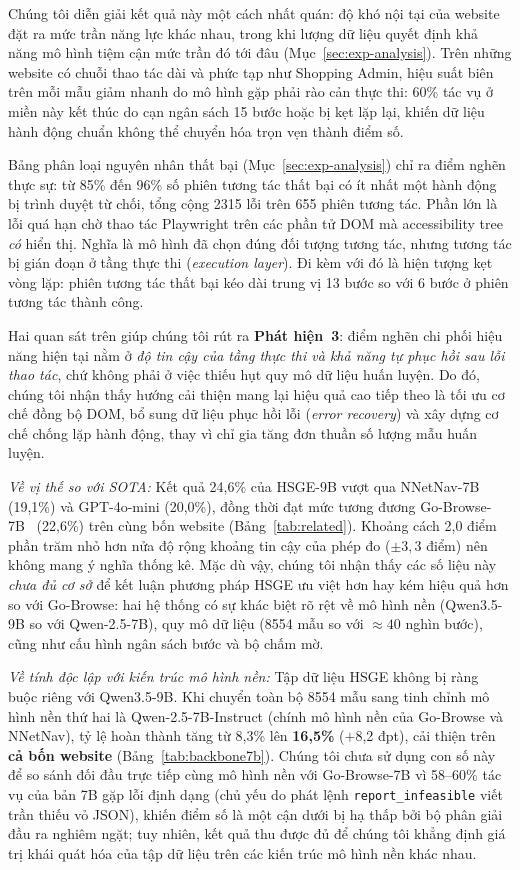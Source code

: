 Chúng tôi diễn giải kết quả này một cách nhất quán: độ khó nội tại của website đặt ra mức trần năng lực khác nhau, trong khi lượng dữ liệu quyết định khả năng mô hình tiệm cận mức trần đó tới đâu (Mục~\ref{sec:exp-analysis}). Trên những website có chuỗi thao tác dài và phức tạp như Shopping Admin, hiệu suất biên trên mỗi mẫu giảm nhanh do mô hình gặp phải rào cản thực thi: 60\% tác vụ ở miền này kết thúc do cạn ngân sách 15 bước hoặc bị kẹt lặp lại, khiến dữ liệu hành động chuẩn không thể chuyển hóa trọn vẹn thành điểm số.

Bảng phân loại nguyên nhân thất bại (Mục~\ref{sec:exp-analysis}) chỉ ra điểm nghẽn thực sự: từ 85\% đến 96\% số phiên tương tác thất bại có ít nhất một hành động bị trình duyệt từ chối, tổng cộng 2315 lỗi trên 655 phiên tương tác. Phần lớn là lỗi quá hạn chờ thao tác Playwright trên các phần tử DOM mà accessibility tree \emph{có} hiển thị. Nghĩa là mô hình đã chọn đúng đối tượng tương tác, nhưng tương tác bị gián đoạn ở tầng thực thi (\emph{execution layer}). Đi kèm với đó là hiện tượng kẹt vòng lặp: phiên tương tác thất bại kéo dài trung vị 13 bước so với 6 bước ở phiên tương tác thành công.

Hai quan sát trên giúp chúng tôi rút ra \textbf{Phát hiện~3}: điểm nghẽn chi phối hiệu năng hiện tại nằm ở \emph{độ tin cậy của tầng thực thi và khả năng tự phục hồi sau lỗi thao tác}, chứ không phải ở việc thiếu hụt quy mô dữ liệu huấn luyện. Do đó, chúng tôi nhận thấy hướng cải thiện mang lại hiệu quả cao tiếp theo là tối ưu cơ chế đồng bộ DOM, bổ sung dữ liệu phục hồi lỗi (\emph{error recovery}) và xây dựng cơ chế chống lặp hành động, thay vì chỉ gia tăng đơn thuần số lượng mẫu huấn luyện.

\emph{Về vị thế so với SOTA:} Kết quả 24{,}6\% của HSGE-9B vượt qua NNetNav-7B~\cite{murty2024nnetnav} (19{,}1\%) và GPT-4o-mini (20{,}0\%), đồng thời đạt mức tương đương Go-Browse-7B~\cite{gandhi2026gobrowse} (22{,}6\%) trên cùng bốn website (Bảng~\ref{tab:related}). Khoảng cách 2{,}0 điểm phần trăm nhỏ hơn nửa độ rộng khoảng tin cậy của phép đo ($\pm 3{,}3$ điểm) nên không mang ý nghĩa thống kê. Mặc dù vậy, chúng tôi nhận thấy các số liệu này \emph{chưa đủ cơ sở} để kết luận phương pháp HSGE ưu việt hơn hay kém hiệu quả hơn so với Go-Browse: hai hệ thống có sự khác biệt rõ rệt về mô hình nền (Qwen3.5-9B so với Qwen-2.5-7B), quy mô dữ liệu (8554 mẫu so với $\approx 40$ nghìn bước), cũng như cấu hình ngân sách bước và bộ chấm mờ.

\emph{Về tính độc lập với kiến trúc mô hình nền:} Tập dữ liệu HSGE không bị ràng buộc riêng với Qwen3.5-9B. Khi chuyển toàn bộ 8554 mẫu sang tinh chỉnh mô hình nền thứ hai là Qwen-2.5-7B-Instruct (chính mô hình nền của Go-Browse và NNetNav), tỷ lệ hoàn thành tăng từ 8{,}3\% lên \textbf{16{,}5\%} ($+$8{,}2 đpt), cải thiện trên \textbf{cả bốn website} (Bảng~\ref{tab:backbone7b}). Chúng tôi chưa sử dụng con số này để so sánh đối đầu trực tiếp cùng mô hình nền với Go-Browse-7B vì 58--60\% tác vụ của bản 7B gặp lỗi định dạng (chủ yếu do phát lệnh \texttt{report\_infeasible} viết trần thiếu vỏ JSON), khiến điểm số là một cận dưới bị hạ thấp bởi bộ phân giải đầu ra nghiêm ngặt; tuy nhiên, kết quả thu được đủ để chúng tôi khẳng định giá trị khái quát hóa của tập dữ liệu trên các kiến trúc mô hình nền khác nhau.

